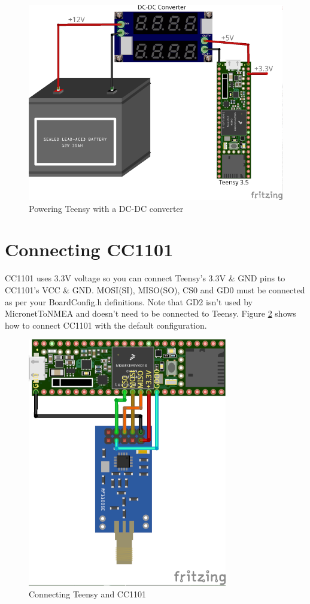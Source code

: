 \documentclass{report}
\begin{document}
\begin{figure}
\centering
\includegraphics{MicronetToNMEA_DC_Power.png}
	\caption{Powering Teensy with a DC-DC converter}
\label{figure:dcpower}
\end{figure}

\section{Connecting CC1101}

CC1101 uses 3.3V voltage so you can connect Teensy's 3.3V \& GND pins to CC1101's VCC \& GND. MOSI(SI), MISO(SO), CS0 and GD0 must be connected as per your BoardConfig.h definitions. Note that GD2 isn't used by MicronetToNMEA and doesn't need to be connected to Teensy. Figure \ref{figure:cc1101} shows how to connect CC1101 with the default configuration.

\begin{figure}[h]
	\centering
	\includegraphics{MicronetToNMEA_CC1101.png}
	\caption{Connecting Teensy and CC1101}
	\label{figure:cc1101}
\end{figure}
\end{document}
